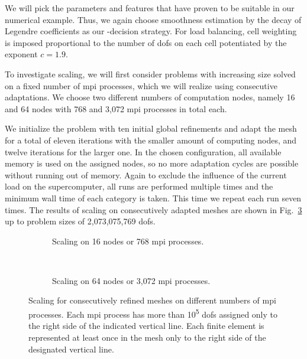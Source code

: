 We will pick the parameters and features that have proven to be suitable in our numerical example. Thus, we again choose smoothness estimation by the decay of Legendre coefficients as our \hp-decision strategy. For load balancing, cell weighting is imposed proportional to the number of \glspl{dof} on each cell potentiated by the exponent $c = 1.9$.



To investigate scaling, we will first consider problems with increasing size solved on a fixed number of \gls{mpi} processes, which we will realize using consecutive adaptations. We choose two different numbers of computation nodes, namely 16 and 64 nodes with 768 and 3,072 \gls{mpi} processes in total each.

We initialize the problem with ten initial global refinements and adapt the mesh for a total of eleven iterations with the smaller amount of computing nodes, and twelve iterations for the larger one. In the chosen configuration, all available memory is used on the assigned nodes, so no more adaptation cycles are possible without running out of memory. Again to exclude the influence of the current load on the supercomputer, all runs are performed multiple times and the minimum wall time of each category is taken. This time we repeat each run seven times. The results of scaling on consecutively adapted meshes are shown in Fig.~\ref{fig:size} up to problem sizes of 2,073,075,769 \glspl{dof}.

\begin{figure}
\begin{subfigure}{1\textwidth}
  \centering
  
  \caption{Scaling on 16 nodes or 768 \gls{mpi} processes.}
  \label{fig:size-nodes16}
\end{subfigure}
\vspace{1em} \\
\begin{subfigure}{1\textwidth}
  \centering
  
  \caption{Scaling on 64 nodes or 3,072 \gls{mpi} processes.}
  \label{fig:size-nodes64}
\end{subfigure}
\caption[Scaling for consecutively refined meshes on different numbers of  processes.]{Scaling for consecutively refined meshes on different numbers of \gls{mpi} processes. Each \gls{mpi} process has more than 10\textsuperscript{5} \glspl{dof} assigned only to the right side of the indicated vertical line. Each finite element is represented at least once in the mesh only to the right side of the designated vertical line.}
\label{fig:size}
\end{figure}

